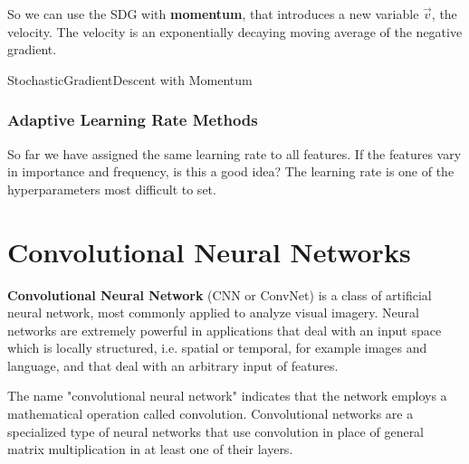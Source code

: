 So we can use the SDG with \textbf{momentum}, that introduces a new variable \(\vec{v}\), the velocity. The velocity is an exponentially decaying moving average of the negative gradient.

\begin{algorithm}
    \caption{StochasticGradientDescent with Momentum}
    \label{alg:stochastic_gradient_descent_momentum}

    
\end{algorithm}

\subsubsection{Adaptive Learning Rate Methods}
So far we have assigned the same learning rate to all features. If the features vary in importance and frequency, is this a good idea? The learning rate is one of the hyperparameters most difficult to set.

\section{Convolutional Neural Networks}
\textbf{Convolutional Neural Network} (CNN or ConvNet) is a class of artificial neural network, most commonly applied to analyze visual imagery.  Neural networks are extremely powerful in applications that deal with an input space which is locally structured, i.e. spatial or temporal, for example images and language, and that deal with an arbitrary input of features.

The name "convolutional neural network" indicates that the network employs a mathematical operation called convolution. Convolutional networks are a specialized type of neural networks that use convolution in place of general matrix multiplication in at least one of their layers.

